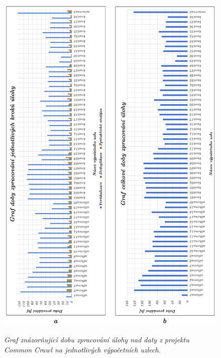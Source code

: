 \begin{figure}[H]
    \begin{center}
        \scalebox{0.8}
        {
            \includegraphics{images/ExecutedTimeGraphs.pdf}
        }
        \caption{\label{obr:executedTimeGraphs} {\it Graf znázorňující dobu zpracování úlohy nad daty z projektu Common Crawl na jednotlivých výpočetních uzlech.}}
    \end{center}
\end{figure}
